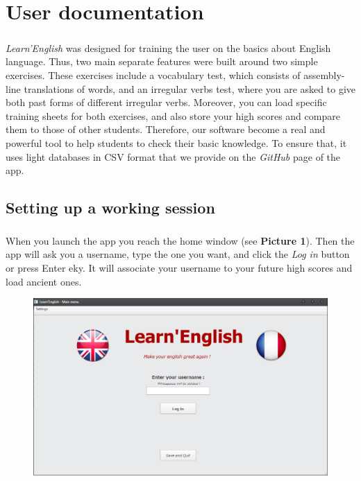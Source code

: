 \documentclass[12pt, a4paper]{report}
\begin{document}
\newpage
\chapter*{User documentation}

\paragraph{}\textit{Learn'English} was designed for training the user on the basics about English language. Thus, two main separate features were built around two simple exercises. These exercises include a vocabulary test, which consists of assembly-line translations of words, and an irregular verbs test, where you are asked to give both past forms of different irregular verbs. Moreover, you can load specific training sheets for both exercises, and also store your high scores and compare them to those of other students. Therefore, our software become a real and powerful tool to help students to check their basic knowledge. To ensure that, it uses light databases in CSV format that we provide on the \textit{GitHub} page of the app.

\section*{\hspace{0.6cm}Setting up a working session}

\paragraph{}When you launch the app you reach the home window (see \textbf{Picture 1}). Then the app will ask you a username, type the one you want, and click the \textit{Log in} button or press Enter eky. It will associate your username to your future high scores and load ancient ones.

\begin{figure}[H]
    \centering
    \includegraphics[scale=0.55]{images/home.png}
\end{figure}
\newpage
\end{document}
